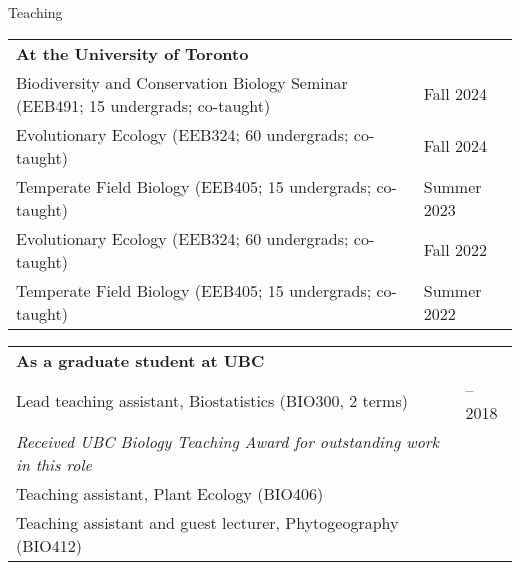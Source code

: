 \documentclass[letterpaper,11pt,oneside]{article}
\begin{document}





\noindent\Large{Teaching}
\normalsize
\medskip

\def\arraystretch{1.1}
\noindent \begin{tabular}{@{} >{\raggedright\arraybackslash}p{14.7cm} >{\raggedleft\arraybackslash}p{2.5cm}}
 \textbf{At the University of Toronto} & \\
 Biodiversity and Conservation Biology Seminar (EEB491; 15 undergrads; co-taught) & Fall 2024\\ 
 Evolutionary Ecology (EEB324; 60 undergrads; co-taught) & Fall 2024\\ 
 Temperate Field Biology (EEB405; 15 undergrads; co-taught) & Summer 2023\\ 
 Evolutionary Ecology (EEB324; 60 undergrads; co-taught) & Fall 2022\\ 
 Temperate Field Biology (EEB405; 15 undergrads; co-taught) & Summer 2022\\ 
\end{tabular}
\noindent \begin{tabular}{@{} >{\raggedright\arraybackslash}p{15.5cm} >{\raggedright\arraybackslash}p{1.7cm}}
 
 \textbf{As a graduate student at UBC} & \\
 Lead teaching assistant, Biostatistics (BIO300, 2 terms) & 2017--2018 \\
  \hspace{5mm}\textit{Received UBC Biology Teaching Award for outstanding work in this role} &  \\
 Teaching assistant, Plant Ecology (BIO406) & 2017 \\
 Teaching assistant and guest lecturer, Phytogeography (BIO412) & 2016 \\ 
\end{tabular}
\bigskip
\end{document}
